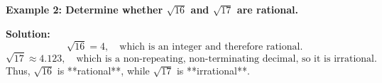 \begin{flushleft}
	\textbf{Example 2: Determine whether $\sqrt{16}$ and $\sqrt{17}$ are rational.}
	
	\textbf{Solution:}  
	\[
	\sqrt{16} = 4, \quad \text{which is an integer and therefore rational.}
	\]
	\[
	\sqrt{17} \approx 4.123, \quad \text{which is a non-repeating, non-terminating decimal, so it is irrational.}
	\]
	Thus, $\sqrt{16}$ is **rational**, while $\sqrt{17}$ is **irrational**.
\end{flushleft}

